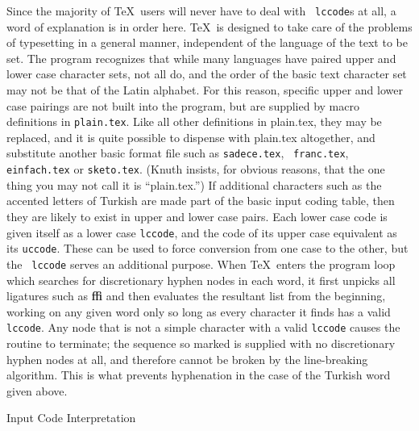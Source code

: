 Since the majority of \TeX\ users will never have to deal with {\tt\bs
lccode}s at all, a word of explanation is in order here.  \TeX\
is designed to take care of the problems of typesetting in a
general manner, independent of the language of the text to be
set.  The program recognizes that while many languages have
paired upper and lower case character sets, not all do, and the
order of the basic text character set may not be that of the
Latin alphabet.  For this reason, specific upper and lower case
pairings are not built into the program, but are supplied by
macro definitions in {\tt plain.tex}.  Like all other
definitions in plain.tex, they may be replaced, and it is quite
possible to dispense with plain.tex altogether, and substitute
another basic format file such as {\tt sadece.tex}, {\tt
franc.tex}, {\tt einfach.tex} or {\tt sketo.tex}.  (Knuth
insists, for obvious reasons, that the one thing you may not call it is
``plain.tex.'')  If additional characters such as the accented letters
of Turkish are made part of the basic input coding table, then they
are likely to exist in upper and lower case pairs.  Each lower case
code is given itself as a lower case {\tt\bs lccode}, and the code of
its upper case equivalent as its {\tt\bs uccode}.  These can be used
to force conversion from one case to the other, but the {\tt\bs
lccode} serves an additional purpose.  When \TeX\ enters the program
loop which searches for discretionary hyphen nodes in each word, it
first unpicks all ligatures such as {\bf ffi} and then evaluates the
resultant list from the beginning,
working on any given word only so long as every character it
finds has a valid {\tt\bs lccode}.  Any node that is not a simple
character with a valid {\tt\bs lccode} causes the routine to terminate;
the sequence so marked is supplied with no discretionary
hyphen nodes at all, and therefore cannot be broken by the
line-breaking algorithm.  This is what prevents hyphenation in the
case of the Turkish word given above.

\medskip
\centerline{\elevenrm Input Code Interpretation}
\smallskip

